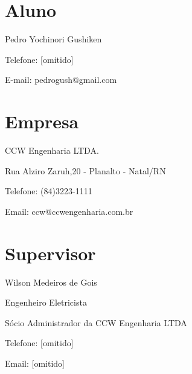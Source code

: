 
	\section{Aluno}
Pedro Yochinori Gushiken\par
[omitido]\par
Telefone: [omitido]\par
E-mail: pedrogush@gmail.com\par


	\section{Empresa}
CCW Engenharia LTDA.\par
Rua Alziro Zaruh,20 - Planalto - Natal/RN\par
Telefone: (84)3223-1111\par
Email: ccw@ccwengenharia.com.br

	\section{Supervisor}
Wilson Medeiros de Gois\par
Engenheiro Eletricista\par 
Sócio Administrador da CCW Engenharia LTDA\par
Telefone: [omitido]\par
Email: [omitido]

